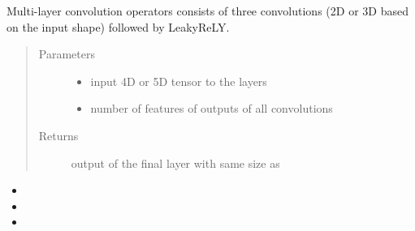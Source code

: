 \documentclass[letterpaper,10pt,english]{sphinxmanual}
\begin{document}
\begin{fulllineitems}
\label{\detokenize{index:boundary.ops.conv_layer}}
Multi-layer convolution operators consists of three convolutions (2D or 3D based on the input shape) followed by
LeakyReLY.
\begin{quote}\begin{description}
\item[{Parameters}] \leavevmode\begin{itemize}
\item {} 
 \textendash{} input 4D or 5D tensor to the layers

\item {} 
 \textendash{} number of features of outputs of all convolutions

\end{itemize}

\item[{Returns}] \leavevmode
output of the final layer with same size as 

\end{description}\end{quote}



\begin{itemize}
\item {} 

\item {} 

\item {} 

\end{itemize}



\end{fulllineitems}

\end{document}
